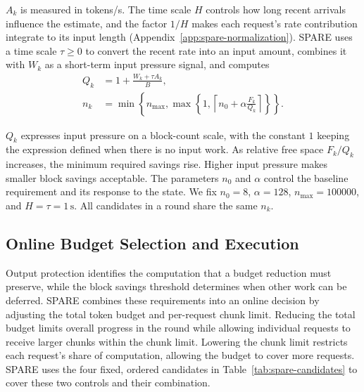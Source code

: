 \documentclass[sigconf,anonymous,review]{acmart}
\begin{document}
$A_k$ is measured in tokens/s. The time scale $H$ controls how long recent arrivals influence the estimate, and the factor $1/H$ makes each request's rate contribution integrate to its input length (Appendix~\ref{app:spare-normalization}). SPARE uses a time scale $\tau\ge0$ to convert the recent rate into an input amount, combines it with $W_k$ as a short-term input pressure signal, and computes
\begin{equation}
\begin{aligned}
Q_k&=1+\frac{W_k+\tau A_k}{B},\\
n_k&=\min\!\left\{n_{\max},
\max\!\left\{1,
\left\lceil n_0+\alpha\frac{F_k}{Q_k}\right\rceil
\right\}\right\}.
\end{aligned}
\tag{11}\label{eq:spare-threshold}
\end{equation}

$Q_k$ expresses input pressure on a block-count scale, with the constant $1$ keeping the expression defined when there is no input work. As relative free space $F_k/Q_k$ increases, the minimum required savings rise. Higher input pressure makes smaller block savings acceptable. The parameters $n_0$ and $\alpha$ control the baseline requirement and its response to the state. We fix $n_0=8$, $\alpha=128$, $n_{\max}=100000$, and $H=\tau=1\,\mathrm{s}$. All candidates in a round share the same $n_k$.

\subsection{Online Budget Selection and Execution}
\label{sec:spare-selection}

Output protection identifies the computation that a budget reduction must preserve, while the block savings threshold determines when other work can be deferred. SPARE combines these requirements into an online decision by adjusting the total token budget and per-request chunk limit. Reducing the total budget limits overall progress in the round while allowing individual requests to receive larger chunks within the chunk limit. Lowering the chunk limit restricts each request's share of computation, allowing the budget to cover more requests. SPARE uses the four fixed, ordered candidates in Table~\ref{tab:spare-candidates} to cover these two controls and their combination.
\end{document}
